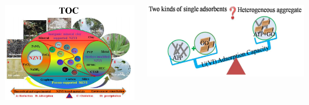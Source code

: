 \documentclass[sans, aspectratio=169]{beamer}
\begin{document}
\begin{frame}
	\begin{columns}
		\begin{column}{0.5\linewidth}
		\centering
		\includegraphics[width=0.8\linewidth]{proposition_from_students/I_like_Huan.png} 
		\end{column}
		\vline
		\begin{column}{0.5\linewidth}
		\centering
		\includegraphics[width=0.8\linewidth]{proposition_from_students/I_dont_like_Huan.png} 
		\end{column}
	\end{columns}
\end{frame}
\end{document}
